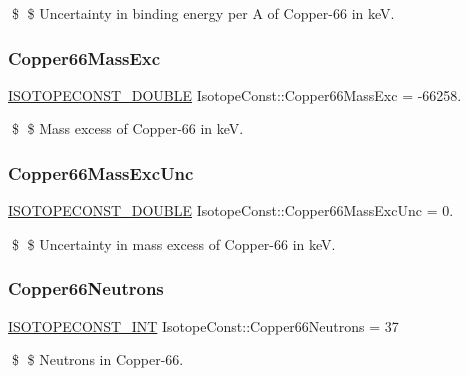 \$ \$ Uncertainty in binding energy per A of Copper-\/66 in keV. \mbox{\label{group___isotope_const-_copper-_cu66_ga5256f8bd013f29eb5440a8cac8aadfa7}} 
\subsubsection{\texorpdfstring{Copper66\+Mass\+Exc}{Copper66MassExc}}
{\footnotesize\ttfamily \mbox{\hyperlink{group___isotope_const-_macros_ga8f45a7272ce02c0b4c65c44636ed719a}{I\+S\+O\+T\+O\+P\+E\+C\+O\+N\+S\+T\+\_\+\+D\+O\+U\+B\+LE}} Isotope\+Const\+::\+Copper66\+Mass\+Exc = -\/66258.}

\$ \$ Mass excess of Copper-\/66 in keV. \mbox{\label{group___isotope_const-_copper-_cu66_ga790d7c9ea04eb3a8ee0ee89bbf6ad68c}} 
\subsubsection{\texorpdfstring{Copper66\+Mass\+Exc\+Unc}{Copper66MassExcUnc}}
{\footnotesize\ttfamily \mbox{\hyperlink{group___isotope_const-_macros_ga8f45a7272ce02c0b4c65c44636ed719a}{I\+S\+O\+T\+O\+P\+E\+C\+O\+N\+S\+T\+\_\+\+D\+O\+U\+B\+LE}} Isotope\+Const\+::\+Copper66\+Mass\+Exc\+Unc = 0.}

\$ \$ Uncertainty in mass excess of Copper-\/66 in keV. \mbox{\label{group___isotope_const-_copper-_cu66_gaa65f592fb783b43b5788cb391f60de5a}} 
\subsubsection{\texorpdfstring{Copper66\+Neutrons}{Copper66Neutrons}}
{\footnotesize\ttfamily \mbox{\hyperlink{group___isotope_const-_macros_ga5f18360b3e99483a35c32d789e62621c}{I\+S\+O\+T\+O\+P\+E\+C\+O\+N\+S\+T\+\_\+\+I\+NT}} Isotope\+Const\+::\+Copper66\+Neutrons = 37}

\$ \$ Neutrons in Copper-\/66. \mbox{\label{group___isotope_const-_copper-_cu66_ga68000e339ccd231662a5e82a4f90b6c1}} 
